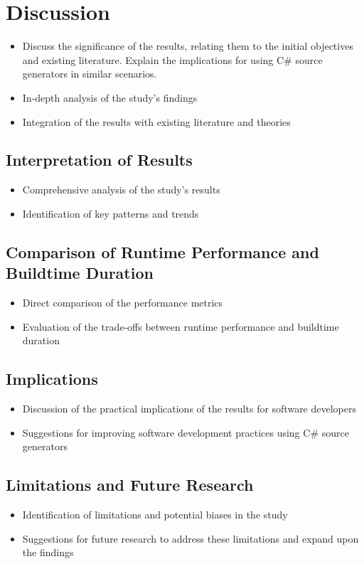 \chapter{Discussion}
\begin{itemize}
    \item Discuss the significance of the results, relating them to the initial objectives and existing literature. Explain the implications for using C\# source generators in similar scenarios.
    \item In-depth analysis of the study's findings
    \item Integration of the results with existing literature and theories
\end{itemize}

\section{Interpretation of Results}

\begin{itemize}
    \item Comprehensive analysis of the study's results
    \item Identification of key patterns and trends
\end{itemize}

\section{Comparison of Runtime Performance and Buildtime Duration}

\begin{itemize}
    \item Direct comparison of the performance metrics
    \item Evaluation of the trade-offs between runtime performance and buildtime duration
\end{itemize}

\section{Implications}

\begin{itemize}
    \item Discussion of the practical implications of the results for software developers
    \item Suggestions for improving software development practices using C\# source generators
\end{itemize}

\section{Limitations and Future Research}

\begin{itemize}
    \item Identification of limitations and potential biases in the study
    \item Suggestions for future research to address these limitations and expand upon the findings
\end{itemize}
